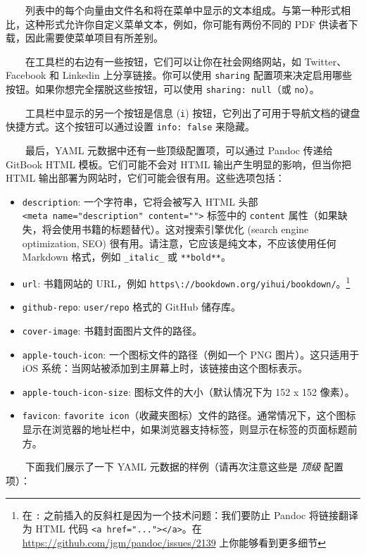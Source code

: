\documentclass[
  12pt,
]{krantz}
\providecommand{\tightlist}{%
  \setlength{\itemsep}{0pt}\setlength{\parskip}{0pt}}
\theoremstyle{definition}
\theoremstyle{definition}
\theoremstyle{definition}
\theoremstyle{definition}
\theoremstyle{remark}
\begin{document}
  列表中的每个向量由文件名和将在菜单中显示的文本组成。与第一种形式相比，这种形式允许你自定义菜单文本，例如，你可能有两份不同的 PDF 供读者下载，因此需要使菜单项目有所差别。

  在工具栏的右边有一些按钮，它们可以让你在社会网络网站，如 Twitter、Facebook 和 Linkedin 上分享链接。你可以使用 \texttt{sharing} 配置项来决定启用哪些按钮。如果你想完全摆脱这些按钮，可以使用 \texttt{sharing:\ null}（或 \texttt{no}）。

  工具栏中显示的另一个按钮是信息 (\texttt{i}) 按钮，它列出了可用于导航文档的键盘快捷方式。这个按钮可以通过设置 \texttt{info:\ false} 来隐藏。

  最后，YAML 元数据中还有一些顶级配置项，可以通过 Pandoc 传递给 GitBook HTML 模板。它们可能不会对 HTML 输出产生明显的影响，但当你把 HTML 输出部署为网站时，它们可能会很有用。这些选项包括：

\begin{itemize}
\tightlist
\item
  \texttt{description}: 一个字符串，它将会被写入 HTML 头部 \texttt{\textless{}meta\ name="description"\ content=""\textgreater{}} 标签中的 \texttt{content} 属性（如果缺失，将会使用书籍的标题替代）。这对搜索引擎优化 (search engine optimization, SEO) 很有用。请注意，它应该是纯文本，不应该使用任何 Markdown 格式，例如 \texttt{\_italic\_} 或 \texttt{**bold**}。
\item
  \texttt{url}: 书籍网站的 URL，例如 \texttt{https\textbackslash{}://bookdown.org/yihui/bookdown/}。\footnote{在 \texttt{:} 之前插入的反斜杠是因为一个技术问题：我们要防止 Pandoc 将链接翻译为 HTML 代码 \texttt{\textless{}a\ href="..."\textgreater{}\textless{}/a\textgreater{}}。在 \url{https://github.com/jgm/pandoc/issues/2139} 上你能够看到更多细节}
\item
  \texttt{github-repo}: \texttt{user/repo} 格式的 GitHub 储存库。
\item
  \texttt{cover-image}: 书籍封面图片文件的路径。
\item
  \texttt{apple-touch-icon}: 一个图标文件的路径（例如一个 PNG 图片）。这只适用于 iOS 系统：当网站被添加到主屏幕上时，该链接由这个图标表示。
\item
  \texttt{apple-touch-icon-size}: 图标文件的大小（默认情况下为 152 x 152 像素）。
\item
  \texttt{favicon}: \texttt{favorite\ icon}（收藏夹图标）文件的路径。通常情况下，这个图标显示在浏览器的地址栏中，如果浏览器支持标签，则显示在标签的页面标题前方。
\end{itemize}

  下面我们展示了一下 YAML 元数据的样例（请再次注意这些是 \emph{顶级} 配置项）：
\end{document}
